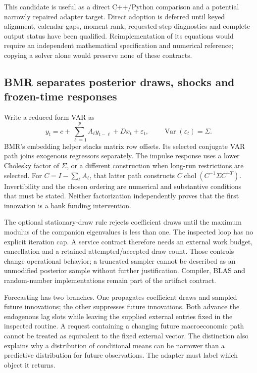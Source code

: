 This candidate is useful as a direct C++/Python comparison and a potential narrowly repaired adapter target. Direct adoption is deferred until keyed alignment, calendar gaps, moment rank, requested-step diagnostics and complete output status have been qualified. Reimplementation of its equations would require an independent mathematical specification and numerical reference; copying a solver alone would preserve none of these contracts.

\subsection{BMR separates posterior draws, shocks and frozen-time responses}

Write a reduced-form VAR as
\[
 y_t=c+\sum_{\ell=1}^{p}A_\ell y_{t-\ell}+D x_t+\varepsilon_t,
 \qquad \operatorname{Var}(\varepsilon_t)=\Sigma.
\]
BMR's embedding helper stacks matrix row offsets. Its selected conjugate VAR path joins exogenous regressors separately. The impulse response uses a lower Cholesky factor of $\Sigma$, or a different construction when long-run restrictions are selected. For $C=I-\sum_\ell A_\ell$, that latter path constructs $C\operatorname{chol}(C^{-1}\Sigma C^{-T})$. Invertibility and the chosen ordering are numerical and substantive conditions that must be stated. Neither factorization independently proves that the first innovation is a bank funding intervention.~\citep{exec25_cdyn_bmr}

The optional stationary-draw rule rejects coefficient draws until the maximum modulus of the companion eigenvalues is less than one. The inspected loop has no explicit iteration cap. A service contract therefore needs an external work budget, cancellation and a retained attempted/accepted draw count. Those controls change operational behavior; a truncated sampler cannot be described as an unmodified posterior sample without further justification. Compiler, BLAS and random-number implementations remain part of the artifact contract.

Forecasting has two branches. One propagates coefficient draws and sampled future innovations; the other suppresses future innovations. Both advance the endogenous lag slots while leaving the supplied external entries fixed in the inspected routine. A request containing a changing future macroeconomic path cannot be treated as equivalent to the fixed external vector. The distinction also explains why a distribution of conditional means can be narrower than a predictive distribution for future observations. The adapter must label which object it returns.~\citep{exec25_cdyn_bmr}

